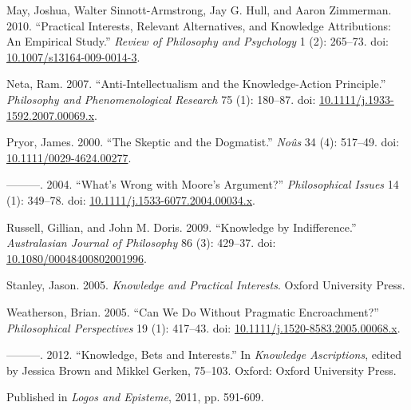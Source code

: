 \documentclass[
  10pt,
  letterpaper,
  DIV=11,
  numbers=noendperiod,
  twoside]{scrartcl}
\newlength{\cslhangindent}
\newenvironment{CSLReferences}[2] %
 {\begin{list}{}{%
  \setlength{\itemindent}{0pt}
  \setlength{\leftmargin}{0pt}
  \setlength{\parsep}{0pt}
  \ifodd #1
   \setlength{\leftmargin}{\cslhangindent}
   \setlength{\itemindent}{-1\cslhangindent}
  \fi
  \setlength{\itemsep}{#2\baselineskip}}}
 {\end{list}}
\begin{document}
\begin{CSLReferences}{1}{0}
May, Joshua, Walter Sinnott-Armstrong, Jay G. Hull, and Aaron Zimmerman.
2010. {``Practical Interests, Relevant Alternatives, and Knowledge
Attributions: An Empirical Study.''} \emph{Review of Philosophy and
Psychology} 1 (2): 265--73. doi:
\href{https://doi.org/10.1007/s13164-009-0014-3}{10.1007/s13164-009-0014-3}.

Neta, Ram. 2007. {``Anti-Intellectualism and the Knowledge-Action
Principle.''} \emph{Philosophy and Phenomenological Research} 75 (1):
180--87. doi:
\href{https://doi.org/10.1111/j.1933-1592.2007.00069.x}{10.1111/j.1933-1592.2007.00069.x}.

Pryor, James. 2000. {``{The Skeptic and the Dogmatist}.''} \emph{No{û}s}
34 (4): 517--49. doi:
\href{https://doi.org/10.1111/0029-4624.00277}{10.1111/0029-4624.00277}.

---------. 2004. {``{What's Wrong with Moore's Argument?}''}
\emph{Philosophical Issues} 14 (1): 349--78. doi:
\href{https://doi.org/10.1111/j.1533-6077.2004.00034.x}{10.1111/j.1533-6077.2004.00034.x}.

Russell, Gillian, and John M. Doris. 2009. {``Knowledge by
Indifference.''} \emph{Australasian Journal of Philosophy} 86 (3):
429--37. doi:
\href{https://doi.org/10.1080/00048400802001996}{10.1080/00048400802001996}.

Stanley, Jason. 2005. \emph{{Knowledge and Practical Interests}}. Oxford
University Press.

Weatherson, Brian. 2005. {``{Can We Do Without Pragmatic
Encroachment?}''} \emph{Philosophical Perspectives} 19 (1): 417--43.
doi:
\href{https://doi.org/10.1111/j.1520-8583.2005.00068.x}{10.1111/j.1520-8583.2005.00068.x}.

---------. 2012. {``Knowledge, Bets and Interests.''} In \emph{Knowledge
Ascriptions}, edited by Jessica Brown and Mikkel Gerken, 75--103.
Oxford: Oxford University Press.

\end{CSLReferences}



\noindent Published in\emph{
Logos and Episteme}, 2011, pp. 591-609.
\end{document}
